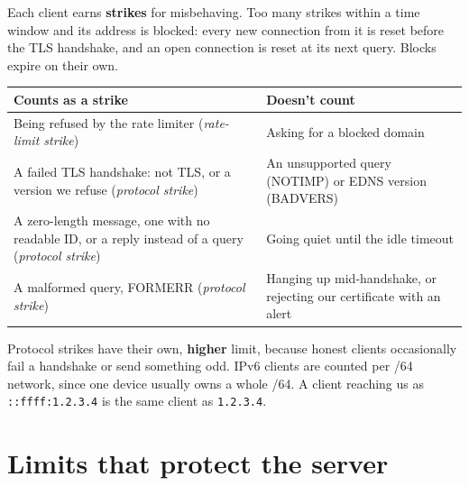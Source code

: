 \documentclass[11pt,a4paper]{article}
\begin{document}
Each client earns \textbf{strikes} for misbehaving. Too many strikes within a time window and its
address is blocked: every new connection from it is reset before the TLS handshake, and an open
connection is reset at its next query. Blocks expire on their own.

\begin{tabularx}{\linewidth}{@{}>{\raggedright\arraybackslash}X>{\raggedright\arraybackslash}X@{}}
\toprule
\textbf{Counts as a strike} & \textbf{Doesn't count} \\
\midrule
Being refused by the rate limiter (\emph{rate-limit strike}) & Asking for a blocked domain \\
A failed TLS handshake: not TLS, or a version we refuse (\emph{protocol strike}) & An unsupported
  query (NOTIMP) or EDNS version (BADVERS) \\
A zero-length message, one with no readable ID, or a reply instead of a query (\emph{protocol
  strike}) & Going quiet until the idle timeout \\
A malformed query, FORMERR (\emph{protocol strike}) & Hanging up mid-handshake, or rejecting our
  certificate with an alert \\
\bottomrule
\end{tabularx}

Protocol strikes have their own, \textbf{higher} limit, because honest clients occasionally fail a
handshake or send something odd. IPv6 clients are counted per /64 network, since one device
usually owns a whole /64. A client reaching us as \texttt{::ffff:1.2.3.4} is the same client as
\texttt{1.2.3.4}.

\section{Limits that protect the server}
\end{document}
